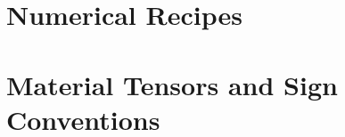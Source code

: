 \documentclass[11pt,twoside,openright]{book}
\theoremstyle{plain}
\theoremstyle{definition}
\theoremstyle{remark}
\begin{document}
\chapter{Numerical Recipes}
\label{app:numerical-recipes}


\chapter{Material Tensors and Sign Conventions}
\label{app:material-tensors}


\backmatter

\printbibliography[heading=bibintoc,title={References}]

\printindex
\end{document}
